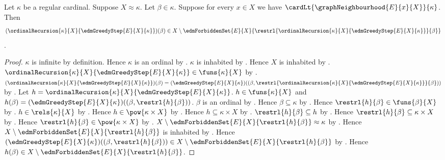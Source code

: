 \begin{theorem}\label{edm_greedy_new_point}
    Let $\kappa$ be a regular cardinal.
    Suppose $X\approx\kappa$.
    Let $\beta\in\kappa$.
    Suppose for every $x\in X$ we have
        $\cardLt{\graphNeighbourhood{E}{x}{X}}{\kappa}$.
    Then
    \[
        (\ordinalRecursion{\kappa}{X}
            {\edmGreedyStep{E}{X}{\kappa}})(\beta)
        \in X\setminus\edmForbiddenSet{E}{X}
            {\restrl{\ordinalRecursion{\kappa}{X}
                {\edmGreedyStep{E}{X}{\kappa}}}{\beta}}
    \].
\end{theorem}
\begin{proof}
    $\kappa$ is infinite by definition.
    Hence $\kappa$ is an ordinal by .
    $\kappa$ is inhabited by .
    Hence $X$ is inhabited by .
    $\ordinalRecursion{\kappa}{X}{\edmGreedyStep{E}{X}{\kappa}}
        \in\funs{\kappa}{X}$ by
        .
    $(\ordinalRecursion{\kappa}{X}
            {\edmGreedyStep{E}{X}{\kappa}})(\beta)
        =(\edmGreedyStep{E}{X}{\kappa})
            ((\beta,\restrl{\ordinalRecursion{\kappa}{X}
                {\edmGreedyStep{E}{X}{\kappa}}}{\beta}))$ by
        .
    Let $h=\ordinalRecursion{\kappa}{X}
        {\edmGreedyStep{E}{X}{\kappa}}$.
    $h\in\funs{\kappa}{X}$ and
        $h(\beta)=(\edmGreedyStep{E}{X}{\kappa})
            ((\beta,\restrl{h}{\beta}))$.
    $\beta$ is an ordinal by .
    Hence $\beta\subseteq\kappa$ by
        .
    Hence $\restrl{h}{\beta}\in\funs{\beta}{X}$ by
        .
    $h\in\rels{\kappa}{X}$ by .
    Hence $h\in\pow{\kappa\times X}$ by .
    Hence $h\subseteq\kappa\times X$ by .
    $\restrl{h}{\beta}\subseteq h$ by .
    Hence $\restrl{h}{\beta}\subseteq\kappa\times X$ by
        .
    Hence $\restrl{h}{\beta}\in\pow{\kappa\times X}$ by
        .
    $X\setminus\edmForbiddenSet{E}{X}{\restrl{h}{\beta}}
        \approx\kappa$ by .
    Hence $X\setminus\edmForbiddenSet{E}{X}{\restrl{h}{\beta}}$
        is inhabited by .
    Hence $(\edmGreedyStep{E}{X}{\kappa})
            ((\beta,\restrl{h}{\beta}))
        \in X\setminus
            \edmForbiddenSet{E}{X}{\restrl{h}{\beta}}$ by
        .
    Hence $h(\beta)\in
        X\setminus\edmForbiddenSet{E}{X}{\restrl{h}{\beta}}$.
\end{proof}

